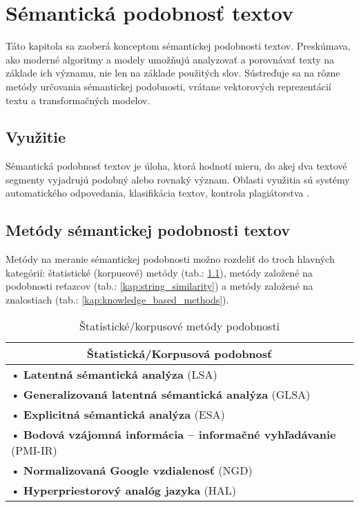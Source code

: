 \chapter{Sémantická podobnosť textov} \nopagebreak
\label{kap:clenenie} 
Táto kapitola sa zaoberá konceptom sémantickej podobnosti textov. Preskúmava, ako moderné algoritmy a modely umožňujú analyzovať a porovnávať texty na základe ich významu, nie len na základe použitých slov. Sústreďuje sa na rôzne metódy určovania sémantickej podobnosti, vrátane vektorových reprezentácií textu a transformačných modelov.
\vspace{-2em}
\section{Využitie}
Sémantická podobnosť textov je úloha, ktorá hodnotí mieru, do akej dva textové segmenty vyjadrujú podobný alebo rovnaký význam. Oblasti využitia sú systémy automatického odpovedania, klasifikácia textov, kontrola plagiátorstva \cite{stss}. 

\section{Metódy sémantickej podobnosti textov}
Metódy na meranie sémantickej podobnosti možno rozdeliť do troch hlavných kategórií: štatistické (korpusové) metódy (tab.: \ref{kap:statistical_similarity}), metódy založené na podobnosti reťazcov (tab.: \ref{kap:string_similarity}) a metódy založené na znalostiach (tab.: \ref{kap:knowledge_based_methods}).

\small
\begin{table}[H]
    \centering
    \renewcommand{\arraystretch}{1.2}
    \begin{tabular}{|l|}
        \hline
        \multicolumn{1}{|c|}{\textbf{Štatistická/Korpusová podobnosť}} \\
        \hline
        • \textbf{Latentná sémantická analýza} (LSA) \\
        • \textbf{Generalizovaná latentná sémantická analýza} (GLSA) \\
        • \textbf{Explicitná sémantická analýza} (ESA) \\
        • \textbf{Bodová vzájomná informácia – informačné vyhľadávanie} (PMI-IR) \\
        • \textbf{Normalizovaná Google vzdialenosť} (NGD) \\
        • \textbf{Hyperpriestorový analóg jazyka} (HAL) \\
        \hline
    \end{tabular}
\caption{Štatistické/korpusové metódy podobnosti}
\label{kap:statistical_similarity}
\end{table}

